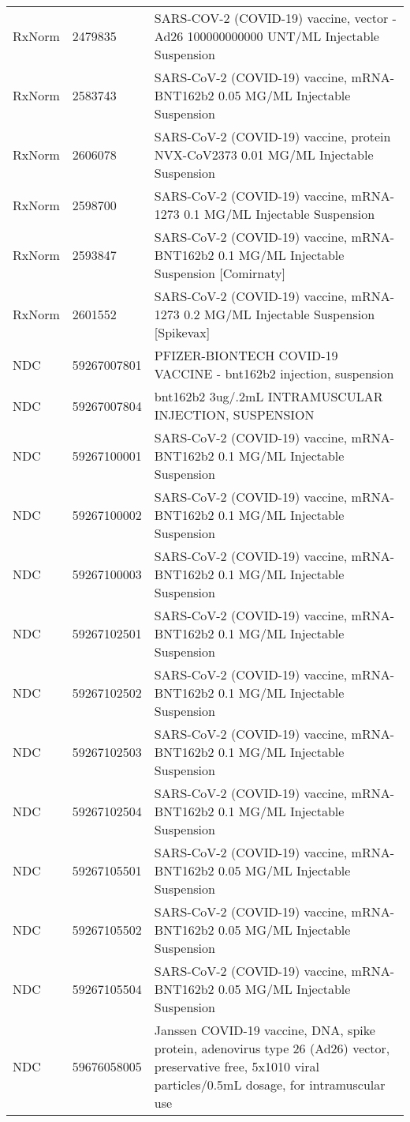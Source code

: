 \begin{longtable}{p{}p{}p{}}
  RxNorm & 2479835 & SARS-COV-2 (COVID-19) vaccine, vector - Ad26 100000000000 UNT/ML Injectable Suspension \\ 
  RxNorm & 2583743 & SARS-CoV-2 (COVID-19) vaccine, mRNA-BNT162b2 0.05 MG/ML Injectable Suspension \\ 
  RxNorm & 2606078 & SARS-CoV-2 (COVID-19) vaccine, protein NVX-CoV2373 0.01 MG/ML Injectable Suspension \\ 
  RxNorm & 2598700 & SARS-CoV-2 (COVID-19) vaccine, mRNA-1273 0.1 MG/ML Injectable Suspension \\ 
  RxNorm & 2593847 & SARS-CoV-2 (COVID-19) vaccine, mRNA-BNT162b2 0.1 MG/ML Injectable Suspension [Comirnaty] \\ 
  RxNorm & 2601552 & SARS-CoV-2 (COVID-19) vaccine, mRNA-1273 0.2 MG/ML Injectable Suspension [Spikevax] \\ 
  NDC & 59267007801 & PFIZER-BIONTECH COVID-19 VACCINE - bnt162b2 injection, suspension \\ 
  NDC & 59267007804 & bnt162b2 3ug/.2mL INTRAMUSCULAR INJECTION, SUSPENSION \\ 
  NDC & 59267100001 & SARS-CoV-2 (COVID-19) vaccine, mRNA-BNT162b2 0.1 MG/ML Injectable Suspension \\ 
  NDC & 59267100002 & SARS-CoV-2 (COVID-19) vaccine, mRNA-BNT162b2 0.1 MG/ML Injectable Suspension \\ 
  NDC & 59267100003 & SARS-CoV-2 (COVID-19) vaccine, mRNA-BNT162b2 0.1 MG/ML Injectable Suspension \\ 
  NDC & 59267102501 & SARS-CoV-2 (COVID-19) vaccine, mRNA-BNT162b2 0.1 MG/ML Injectable Suspension \\ 
  NDC & 59267102502 & SARS-CoV-2 (COVID-19) vaccine, mRNA-BNT162b2 0.1 MG/ML Injectable Suspension \\ 
  NDC & 59267102503 & SARS-CoV-2 (COVID-19) vaccine, mRNA-BNT162b2 0.1 MG/ML Injectable Suspension \\ 
  NDC & 59267102504 & SARS-CoV-2 (COVID-19) vaccine, mRNA-BNT162b2 0.1 MG/ML Injectable Suspension \\ 
  NDC & 59267105501 & SARS-CoV-2 (COVID-19) vaccine, mRNA-BNT162b2 0.05 MG/ML Injectable Suspension \\ 
  NDC & 59267105502 & SARS-CoV-2 (COVID-19) vaccine, mRNA-BNT162b2 0.05 MG/ML Injectable Suspension \\ 
  NDC & 59267105504 & SARS-CoV-2 (COVID-19) vaccine, mRNA-BNT162b2 0.05 MG/ML Injectable Suspension \\ 
  NDC & 59676058005 & Janssen COVID-19 vaccine, DNA, spike protein, adenovirus type 26 (Ad26) vector, preservative free, 5x1010 viral particles/0.5mL dosage, for intramuscular use \\ 

\end{longtable}
